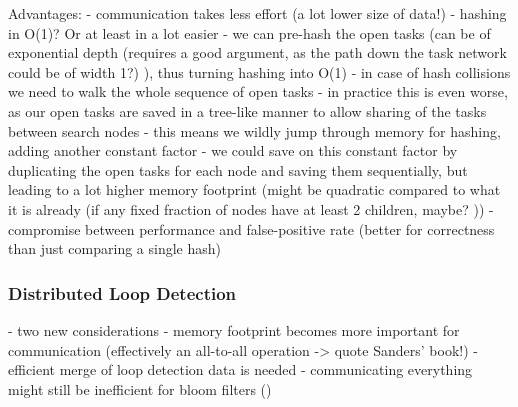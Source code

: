 Advantages:
- communication takes less effort (a lot lower size of data!)
- hashing in O(1)? Or at least in a lot easier
- we can pre-hash the open tasks (can be of exponential depth (requires a good argument, as the path down the task network could be of width 1?) ), thus turning hashing into O(1)
- in case of hash collisions we need to walk the whole sequence of open tasks
- in practice this is even worse, as our open tasks are saved in a tree-like manner to allow sharing of the tasks between search nodes
- this means we wildly jump through memory for hashing, adding another constant factor
- we could save on this constant factor by duplicating the open tasks for each node and saving them sequentially, but leading to a lot higher memory footprint (might be quadratic compared to what it is already (if any fixed fraction of nodes have at least 2 children, maybe? ))
- compromise between performance and false-positive rate (better for correctness than just comparing a single hash)

\subsubsection{Distributed Loop Detection}
- two new considerations
	- memory footprint becomes more important for communication (effectively an all-to-all operation -> quote Sanders' book!)
	- efficient merge of loop detection data is needed
- communicating everything might still be inefficient for bloom filters ()